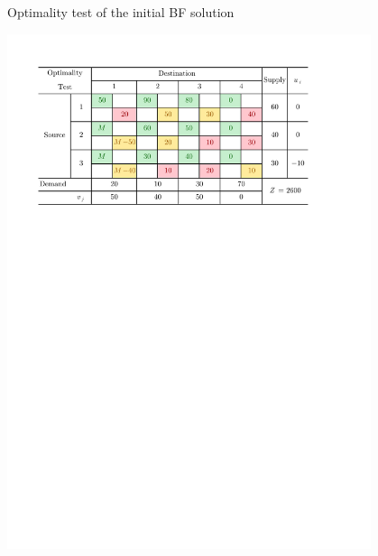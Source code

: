 \documentclass[a4paper]{article}
\begin{document}
\begin{enumerate}
\begin{enumerate}
\begin{solution}
	\begin{table}[H]
		\caption{Optimality test of the initial BF solution}
		\label{tabVOOP}
		\centering
		\includegraphics[width = 0.8\textwidth]{VOOP}				
	\end{table}
	
	\end{solution}
\end{enumerate}


\end{enumerate}
%  

%  
  
\end{document}

